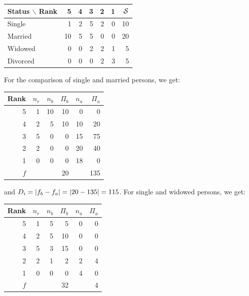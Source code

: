 \begin{refsection}
\begin{tabular}{l|rrrrr|r}
  \toprule
  Status \( \backslash \) Rank & 5  & 4  & 3  & 2  & 1  & \(\mathcal{S} \) \\
  \midrule
  Single   &  1 &  2 &  5 &  2 &  0 & 10 \\
  Married  & 10 &  5 &  5 &  0 &  0 & 20 \\
  Widowed  &  0 &  0 &  2 &  2 &  1 &  5 \\
  Divorced &  0 &  0 &  0 &  2 &  3 &  5 \\
  \bottomrule
\end{tabular}

For the comparison of single and married persons, we get:

\begin{tabular}{r|rrrrr}
  \toprule
  Rank & \(n_r \)  & \(n_b \)  & \(\Pi_b \) & \(n_a \)  & \(\Pi_a \) \\
  \midrule
  5    &     1  &   10   &   10    &    0   &      0  \\
  4    &     2  &    5   &   10    &   10   &     20  \\
  3    &     5  &    0   &    0    &   15   &     75  \\
  2    &     2  &    0   &    0    &   20   &     40  \\
  1    &     0  &    0   &    0    &   18   &      0  \\
  \midrule
 \(f \)  &        &        &   20    &        &    135  \\
  \bottomrule
\end{tabular}

and \(D_i = |f_b - f_a| = |20 - 135| = 115 \). For single and widowed persons, we get:

\begin{tabular}{r|rrrrr}
  \toprule
  Rank & \(n_r \)  & \(n_b \)  & \(\Pi_b \) & \(n_a \)  & \(\Pi_a \) \\
  \midrule
  5    &     1  &    5   &    5    &    0   &      0  \\
  4    &     2  &    5   &   10    &    0   &      0  \\
  3    &     5  &    3   &   15    &    0   &      0  \\
  2    &     2  &    1   &    2    &    2   &      4  \\
  1    &     0  &    0   &    0    &    4   &      0  \\
  \midrule
 \(f \)  &        &        &   32    &        &      4  \\
  \bottomrule
\end{tabular}


\end{refsection}
